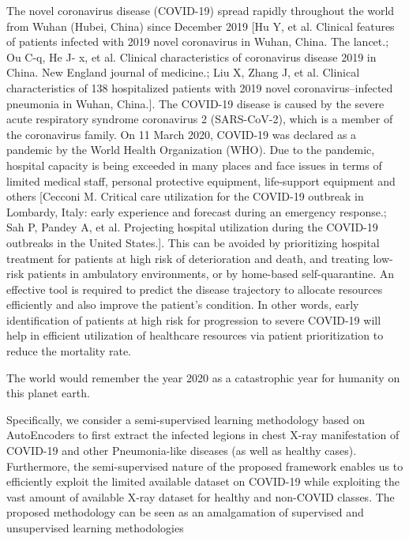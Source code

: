 The novel coronavirus disease (COVID-19) spread rapidly throughout the world from Wuhan (Hubei, China) since December 2019 [Hu Y, et al. Clinical features of patients infected with 2019 novel coronavirus in Wuhan, China. The lancet.; Ou C-q, He J- x, et al. Clinical characteristics of coronavirus disease 2019 in China. New England journal of medicine.; Liu X, Zhang J, et al. Clinical characteristics of 138 hospitalized patients with 2019 novel coronavirus–infected pneumonia in Wuhan, China.]. The COVID-19 disease is caused by the severe acute respiratory syndrome coronavirus 2 (SARS-CoV-2), which is a member of the coronavirus family. On 11 March 2020, COVID-19 was declared as a pandemic by the World Health Organization (WHO). Due to the pandemic, hospital capacity is being exceeded in many places and face issues in terms of limited medical staff, personal protective equipment, life-support equipment and others [Cecconi M. Critical care utilization for the COVID-19 outbreak in Lombardy, Italy: early experience and forecast during an emergency response.; Sah P, Pandey A, et al. Projecting hospital utilization during the COVID-19 outbreaks in the United States.].
This can be avoided by prioritizing hospital treatment for patients at high risk of deterioration and death, and treating low-risk patients in ambulatory environments, or by home-based self-quarantine. An effective tool is required to predict the disease trajectory to allocate resources efficiently and also improve the patient’s condition. In other words, early identification of patients at high risk for progression to severe COVID-19 will help in efficient utilization of healthcare resources via patient prioritization to reduce the mortality rate.

The world would remember the year 2020 as a catastrophic year for humanity on this planet earth.

Specifically, we consider a semi-supervised learning methodology based on AutoEncoders to first extract the infected legions in chest X-ray manifestation of COVID-19 and other Pneumonia-like diseases (as well as healthy cases). 
Furthermore, the semi-supervised nature of the proposed framework enables us to efficiently exploit the limited available dataset on COVID-19 while exploiting the vast amount of available X-ray dataset for healthy and non-COVID classes. 
The proposed methodology can be seen as an amalgamation of supervised and unsupervised learning methodologies


